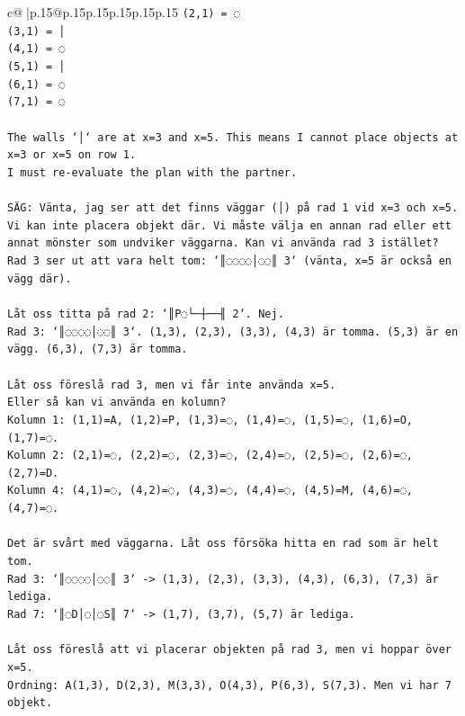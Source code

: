 \documentclass{article}
\begin{document}
{\begin{supertabular}{c@{$\;$}|p{.15\linewidth}@{}p{.15\linewidth}p{.15\linewidth}p{.15\linewidth}p{.15\linewidth}p{.15\linewidth}}
{{{\texttt{(2,1) = ◌} \\
\texttt{(3,1) = │} \\
\texttt{(4,1) = ◌} \\
\texttt{(5,1) = │} \\
\texttt{(6,1) = ◌} \\
\texttt{(7,1) = ◌} \\
\\ 
\texttt{The walls `│` are at x=3 and x=5. This means I cannot place objects at x=3 or x=5 on row 1.} \\
\texttt{I must re{-}evaluate the plan with the partner.} \\
\\ 
\texttt{SÄG: Vänta, jag ser att det finns väggar (│) på rad 1 vid x=3 och x=5. Vi kan inte placera objekt där. Vi måste välja en annan rad eller ett annat mönster som undviker väggarna. Kan vi använda rad 3 istället? Rad 3 ser ut att vara helt tom: `║◌◌◌◌│◌◌║ 3` (vänta, x=5 är också en vägg där).} \\
\\ 
\texttt{Låt oss titta på rad 2: `║P◌└─┼──╢ 2`. Nej.} \\
\texttt{Rad 3: `║◌◌◌◌│◌◌║ 3`. (1,3), (2,3), (3,3), (4,3) är tomma. (5,3) är en vägg. (6,3), (7,3) är tomma.} \\
\\ 
\texttt{Låt oss föreslå rad 3, men vi får inte använda x=5.} \\
\texttt{Eller så kan vi använda en kolumn?} \\
\texttt{Kolumn 1: (1,1)=A, (1,2)=P, (1,3)=◌, (1,4)=◌, (1,5)=◌, (1,6)=O, (1,7)=◌.} \\
\texttt{Kolumn 2: (2,1)=◌, (2,2)=◌, (2,3)=◌, (2,4)=◌, (2,5)=◌, (2,6)=◌, (2,7)=D.} \\
\texttt{Kolumn 4: (4,1)=◌, (4,2)=◌, (4,3)=◌, (4,4)=◌, (4,5)=M, (4,6)=◌, (4,7)=◌.} \\
\\ 
\texttt{Det är svårt med väggarna. Låt oss försöka hitta en rad som är helt tom.} \\
\texttt{Rad 3: `║◌◌◌◌│◌◌║ 3` {-}> (1,3), (2,3), (3,3), (4,3), (6,3), (7,3) är lediga.} \\
\texttt{Rad 7: `║◌D│◌│◌S║ 7` {-}> (1,7), (3,7), (5,7) är lediga.} \\
\\ 
\texttt{Låt oss föreslå att vi placerar objekten på rad 3, men vi hoppar över x=5.} \\
\texttt{Ordning: A(1,3), D(2,3), M(3,3), O(4,3), P(6,3), S(7,3). Men vi har 7 objekt.} \\
}}}
\end{supertabular}}
\end{document}
